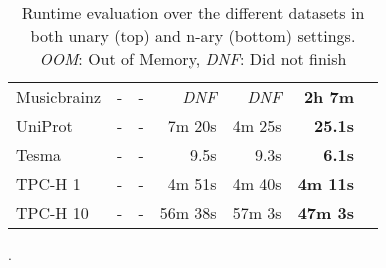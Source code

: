 \begin{table}[]
{\begin{tabular}{lrrrrrr}
        Musicbrainz & - & - & \textit{DNF} & \textit{DNF} & \textbf{2h 7m} \\
        UniProt & - & - & 7m 20s & 4m 25s & \textbf{25.1s} \\
        Tesma & - & - & 9.5s & 9.3s & \textbf{6.1s} \\
        TPC-H 1 & - & - & 4m 51s & 4m 40s & \textbf{4m 11s} \\
        TPC-H 10 & - & - & 56m 38s & 57m 3s & \textbf{47m 3s} \\
        \hline
    \end{tabular}
    }
    \caption{Runtime evaluation over the different datasets in both unary (top) and n-ary (bottom) settings. \textit{OOM}: Out of Memory, \textit{DNF}: Did not finish}.
    \label{tab:runtimes}
\end{table}

